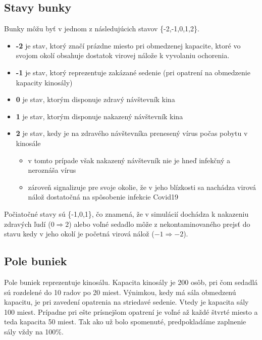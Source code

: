\documentclass[a4paper, 11pt]{article}
\begin{document}
        \subsection{Stavy bunky}
        Bunky môžu byť v jednom z následujúcich stavov \{-2,-1,0,1,2\}.
        \begin{itemize}
            \item \textbf{-2} je stav, ktorý značí prázdne miesto pri obmedzenej kapacite, ktoré vo svojom okolí obsahuje dostatok virovej nálože k vyvolaniu ochorenia.
            \item \textbf{-1} je stav, ktorý reprezentuje zakázané sedenie (pri opatrení na obmedzenie kapacity kinosály)
            \item \textbf{0} je stav, ktorým disponuje zdravý návštevník kina
            \item \textbf{1} je stav, ktorým disponuje nakazený návštevník kina
            \item \textbf{2} je stav, kedy je na zdravého návštevníka prenesený vírus počas pobytu v kinosále
            \begin{itemize}
                \item v tomto prípade však nakazený návštevník nie je hneď infekčný a neroznáša vírus
                \item zároveň signalizuje pre svoje okolie, že v jeho blízkosti sa nachádza virová nálož dostatočná na spôsobenie infekcie Covid19 
            \end{itemize}
        \end{itemize}
        \par Počiatočné stavy sú \{-1,0,1\}, čo znamená, že v simulácií dochádza k nakazeniu zdravých ľudí ($0 \Rightarrow 2$) alebo voľné sedadlo môže z nekontaminovaného prejsť do stavu kedy v jeho okolí je početná virová nálož ($-1 \Rightarrow -2$). 
        
        \subsection{Pole buniek}
        Pole buniek reprezentuje kinosálu. Kapacita kinosály je 200 osôb, pri čom sedadlá sú rozdelené do 10 radov po 20 miest. Výnimkou, kedy má sála obmedzenú kapacitu, je pri zavedení opatrenia na striedavé sedenie. Vtedy je kapacita sály 100 miest. Prípadne pri ešte prísnejšom opatrení je voľné až každé štvrté miesto a teda kapacita 50 miest. Tak ako už bolo spomenuté, predpokladáme zaplnenie sály vždy na 100\%.
        
\end{document}
